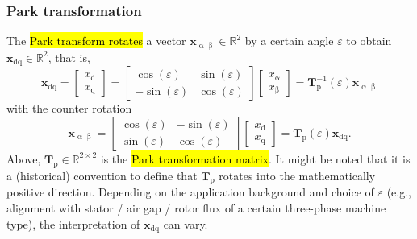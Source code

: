 \begin{frame}
    \frametitle{Park transformation}
    The \hl{Park transform rotates} a vector $\bm{x}_{\upalpha\upbeta}\in\mathbb{R}^2$ by a certain angle $\varepsilon$ to obtain $\bm{x}_\mathrm{dq}\in\mathbb{R}^2$, that is,
    \begin{equation}
        \renewcommand{\arraystretch}{1.2}
        \bm{x}_{\mathrm{dq}} = \begin{bmatrix} x_\mathrm{d} \\ x_\mathrm{q} \end{bmatrix} = \begin{bmatrix}
            \cos(\varepsilon)  & \sin(\varepsilon) \\
            -\sin(\varepsilon) & \cos(\varepsilon)
        \end{bmatrix} \begin{bmatrix} x_\upalpha \\ x_\upbeta \end{bmatrix} = \bm{T}_\mathrm{p}^{-1}(\varepsilon) \bm{x}_\mathrm{\upalpha \upbeta}
        \label{eq:Park_transformation}
    \end{equation}
    \pause
    with the counter rotation
    \begin{equation}
        \renewcommand{\arraystretch}{1.2}
        \bm{x}_{\upalpha\upbeta} = \begin{bmatrix}
            \cos(\varepsilon) & -\sin(\varepsilon) \\
            \sin(\varepsilon) & \cos(\varepsilon)
        \end{bmatrix} \begin{bmatrix} x_\mathrm{d} \\ x_\mathrm{q} \end{bmatrix} = \bm{T}_\mathrm{p}(\varepsilon) \bm{x}_{\mathrm{dq}}.
    \end{equation}
    \pause
    Above, $\bm{T}_\mathrm{p}\in\mathbb{R}^{2\times 2}$ is the \hl{Park transformation matrix}. It might be noted that it is a (historical) convention to define that $\bm{T}_\mathrm{p}$ rotates into the mathematically positive direction. Depending on the application background and choice of $\varepsilon$ (e.g., alignment with stator / air gap / rotor flux of a certain three-phase machine type), the interpretation of $\bm{x}_\mathrm{dq}$ can vary.
\end{frame}

